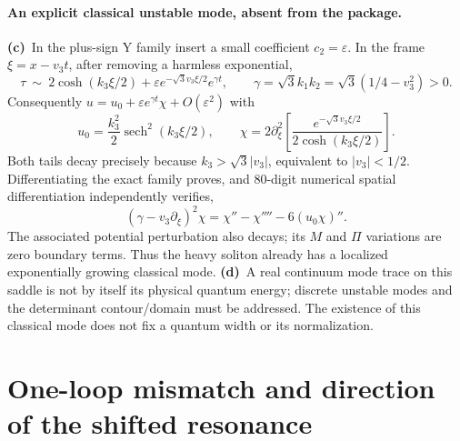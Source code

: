 \documentclass[11pt,a4paper]{article}
\newcommand{\Lc}{\textbf{(c)}\ }
\newcommand{\Ld}{\textbf{(d)}\ }
\begin{document}
\paragraph{An explicit classical unstable mode, absent from the package.}
\Lc In the plus-sign Y family insert a small coefficient $c_2=\varepsilon$.
In the frame $\xi=x-v_3t$, after removing a harmless exponential,
\begin{equation}
 \tau\ \sim\ 2\cosh(k_3\xi/2)
       +\varepsilon e^{-\sqrt3v_3\xi/2}e^{\gamma t},\qquad
 \gamma=\sqrt3 k_1k_2=\sqrt3(1/4-v_3^2)>0.
\end{equation}
Consequently $u=u_0+\varepsilon e^{\gamma t}\chi+O(\varepsilon^2)$ with
\begin{equation}
 u_0=\frac{k_3^2}{2}\operatorname{sech}^2(k_3\xi/2),\qquad
 \chi=2\partial_\xi^2
 \left[\frac{e^{-\sqrt3v_3\xi/2}}{2\cosh(k_3\xi/2)}\right].
 \label{unstable}
\end{equation}
Both tails decay precisely because $k_3>\sqrt3|v_3|$, equivalent to
$|v_3|<1/2$. Differentiating the exact family proves, and 80-digit numerical
spatial differentiation independently verifies,
\[
 (\gamma-v_3\partial_\xi)^2\chi
 =\chi''-\chi''''-6(u_0\chi)''.
\]
The associated potential perturbation also decays; its $M$ and $\Pi$
variations are zero boundary terms. Thus the heavy soliton already has a
localized exponentially growing classical mode. \Ld A real continuum mode
trace on this saddle is not by itself its physical quantum energy; discrete
unstable modes and the determinant contour/domain must be addressed. The
existence of this classical mode does not fix a quantum width or its
normalization.

\section{One-loop mismatch and direction of the shifted resonance}
\end{document}
